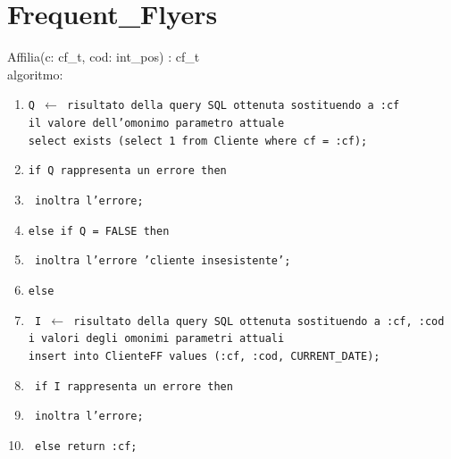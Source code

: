 \documentclass[a4paper,12pt]{report}
\begin{document}
      \section{Frequent\_Flyers}
        Affilia(c: cf\_t, cod: int\_pos) : cf\_t \\
        \hspace*{1cm}algoritmo:
        \begin{enumerate}[label*=\arabic*]
          \item \texttt{Q $\leftarrow$ risultato della query SQL ottenuta sostituendo a :cf \\
            \hspace*{1cm} il valore dell'omonimo parametro attuale \\
            \hspace*{1cm} select exists (select 1 from Cliente where cf = :cf);}
          \item \texttt{if Q rappresenta un errore then}
          \item \texttt{\hspace*{1cm} inoltra l'errore;}
          \item \texttt{else if Q = FALSE then}
          \item \texttt{\hspace*{1cm} inoltra l'errore 'cliente insesistente';}
          \item \texttt{else}
          \item \texttt{\hspace*{1cm} I $\leftarrow$ risultato della query SQL ottenuta sostituendo a :cf, :cod \\
            \hspace*{2cm} i valori degli omonimi parametri attuali \\
            \hspace*{2cm} insert into ClienteFF values (:cf, :cod, CURRENT\_DATE);}
          \item \texttt{\hspace*{1cm} if I rappresenta un errore then}
          \item \texttt{\hspace*{2cm} inoltra l'errore;}
          \item \texttt{\hspace*{1cm} else return :cf;}
        \end{enumerate}
\end{document}

